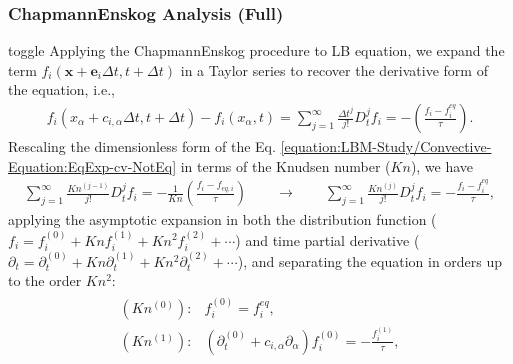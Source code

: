 \documentclass[letterpaper,10pt,english,openany,oneside]{jupyterBook}
\begin{document}
\subsubsection{Chapmann\sphinxhyphen{}Enskog Analysis (Full)}
\label{\detokenize{LBM-Study/Convective-Equation:chapmann-enskog-analysis-full}}
\begin{sphinxuseclass}{toggle}
\sphinxAtStartPar
Applying the Chapmann\sphinxhyphen{}Enskog procedure to LB equation, we expand the term \(f_{i}\left(\boldsymbol{x}+\boldsymbol{e}_i \Delta t, t+\Delta t\right)\) in a Taylor series to recover the derivative form of the equation, i.e.,
\begin{equation}\label{equation:LBM-Study/Convective-Equation:EqExp-cv-NotEq}
\begin{split}
f_{i}\left(x_{\alpha} + c_{i,\alpha} \Delta t, t+\Delta t\right)- f_{i}(x_{\alpha}, t)=\displaystyle\sum_{j=1}^{\infty}\frac{\Delta t^{j}}{j!}D_{t}^{j}f_{i}= -\left( \frac{ f_{i} - f_{i}^{eq} }{ \tau } \right) .
\end{split}
\end{equation}
\sphinxAtStartPar
Rescaling the dimensionless form of the Eq. \eqref{equation:LBM-Study/Convective-Equation:EqExp-cv-NotEq} in terms of the Knudsen number (\(Kn\)), we have
\begin{equation*}
\begin{split}
\displaystyle \sum^{\infty}_{j=1}  \frac{Kn^{(j-1)}}{j!} D_{t}^{j} f_{i} = - \frac{1}{Kn}\left( \frac{ f_{i} - f_{eq,i} }{ \tau } \right) \quad \quad \rightarrow \quad \quad \displaystyle \sum^{\infty}_{j=1}  \frac{Kn^{(j)}}{j!} D_{t}^{j} f_{i} = -  \frac{ f_{i} - f_{i}^{eq} }{ \tau },
\end{split}
\end{equation*}
\sphinxAtStartPar
applying the asymptotic expansion in both the distribution function (\(f_{i}=f_{i}^{(0)}+Kn f_{i}^{(1)} + Kn^{2} f_{i}^{(2)}+\cdots\)) and time partial derivative (\(\partial_{t}=\partial_{t}^{(0)}+ Kn \partial_{t}^{(1)}+Kn^{2} \partial_{t}^{(2)}+\cdots\)), and separating the equation in orders up to the order \(Kn^{2}\):
\begin{equation}\label{equation:LBM-Study/Convective-Equation:Chap-Kn-cv-NotEq}
\begin{split}
\begin{array}{ll}
    (Kn^{(0)}):& f_{i}^{(0)}= f_{i}^{eq},\\
    (Kn^{(1)}):& \left( \partial_{t}^{(0)} + c_{i,\alpha}\partial_{\alpha} \right)f_{i}^{(0)}= - \displaystyle\frac{ f_{i}^{(1)} }{ \tau } , \\

\end{array}
\end{split}
\end{equation}
\end{sphinxuseclass}
\end{document}
